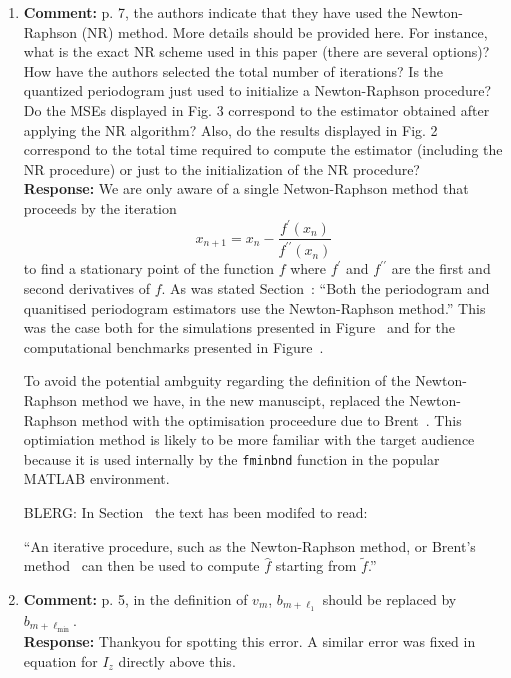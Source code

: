 \documentclass[a4paper,10pt]{article}
\begin{document}
\begin{enumerate}
\item\textbf{Comment:}\label{com:rev1:nr}
p. 7, the authors indicate that they have used the Newton-Raphson (NR)
method. More details should be provided here. For instance, what is the exact
NR scheme used in this paper (there are several options)? How have the
authors selected the total number of iterations? Is the quantized periodogram
just used to initialize a Newton-Raphson procedure? Do the MSEs displayed
in Fig. 3 correspond to the estimator obtained after applying the NR algorithm?
Also, do the results displayed in Fig. 2 correspond to the total time
required to compute the estimator (including the NR procedure) or just to the
initialization of the NR procedure?
\\
\textbf{Response:}
We are only aware of a single Netwon-Raphson method that proceeds by the iteration
\[
x_{n+1} = x_n - \frac{f^\prime(x_{n})}{f^{\prime\prime}(x_n)}
\]
to find a stationary point of the function $f$ where $f^\prime$ and $f^{\prime\prime}$ are the first and second derivatives of $f$.  As was stated Section~: ``Both the periodogram and quanitised periodogram estimators use the Newton-Raphson method.''  This was the case both for the simulations presented in Figure~ and for the computational benchmarks presented in Figure~.

To avoid the potential ambguity regarding the definition of the Newton-Raphson method we have, in the new manuscipt, replaced the Newton-Raphson method with the optimisation proceedure due to Brent~\cite[Ch.~5]{Brent_opt_no_derivs_1973}.  This optimiation method is likely to be more familiar with the target audience because it is used internally by the \texttt{fminbnd} function in the popular MATLAB environment.

BLERG: In Section~ the text has been modifed to read:

``An iterative procedure, such as the Newton-Raphson method, or Brent's method~\cite{Brent_opt_no_derivs_1973} 
can then be used to compute $\hat{f}$ starting from $\widetilde{f}$.''



\item\textbf{Comment:}
p. 5, in the definition of $v_m$, $b_{m+\ell_1}$ should be replaced by $b_{m+\ell_{\text{min}}}$.
\\
\textbf{Response:}
Thankyou for spotting this error.  A similar error was fixed in equation for $I_z$ directly above this. 



\end{enumerate}
\end{document}

